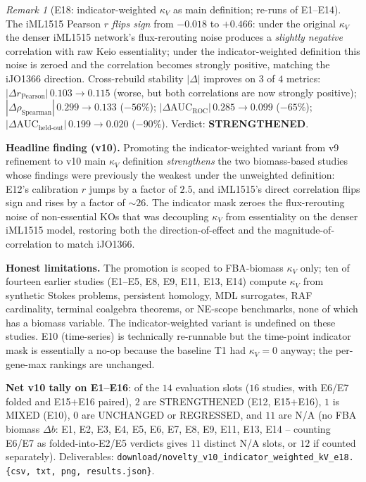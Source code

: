 \documentclass[11pt,a4paper]{article}
\theoremstyle{plain}
\theoremstyle{definition}
\theoremstyle{remark}
\newtheorem{remark}[theorem]{Remark}
\begin{document}
\begin{remark}[E18: indicator-weighted $\kappa_V$ as main definition;
re-runs of E1--E14]
The iML1515 Pearson $r$ \emph{flips sign} from $-0.018$ to $+0.466$:
under the original $\kappa_V$ the denser iML1515 network's
flux-rerouting noise produces a \emph{slightly negative} correlation
with raw Keio essentiality; under the indicator-weighted definition
this noise is zeroed and the correlation becomes strongly positive,
matching the iJO1366 direction. Cross-rebuild stability $|\Delta|$
improves on $3$ of $4$ metrics:
$|\Delta r_{\text{Pearson}}| \, 0.103 \to 0.115$ (worse, but both
correlations are now strongly positive);
$|\Delta \rho_{\text{Spearman}}| \, 0.299 \to 0.133$ ($-56\%$);
$|\Delta \text{AUC}_{\text{ROC}}| \, 0.285 \to 0.099$ ($-65\%$);
$|\Delta \text{AUC}_{\text{held-out}}| \, 0.199 \to 0.020$
($-90\%$). Verdict: \textbf{STRENGTHENED}.

\textbf{Headline finding (v10).} Promoting the indicator-weighted
variant from v9 refinement to v10 main $\kappa_V$ definition
\emph{strengthens} the two biomass-based studies whose findings were
previously the weakest under the unweighted definition: E12's
calibration $r$ jumps by a factor of $2.5$, and iML1515's direct
correlation flips sign and rises by a factor of $\sim 26$.
The indicator mask zeroes the flux-rerouting noise of non-essential
KOs that was decoupling $\kappa_V$ from essentiality on the denser
iML1515 model, restoring both the direction-of-effect and the
magnitude-of-correlation to match iJO1366.

\textbf{Honest limitations.} The promotion is scoped to FBA-biomass
$\kappa_V$ only; ten of fourteen earlier studies (E1--E5, E8, E9,
E11, E13, E14) compute $\kappa_V$ from synthetic Stokes problems,
persistent homology, MDL surrogates, RAF cardinality, terminal
coalgebra theorems, or NE-scope benchmarks, none of which has a
biomass variable. The indicator-weighted variant is undefined on
these studies. E10 (time-series) is technically re-runnable but the
time-point indicator mask is essentially a no-op because the
baseline T1 had $\kappa_V = 0$ anyway; the per-gene-max rankings
are unchanged.

\textbf{Net v10 tally on E1--E16}: of the $14$ evaluation slots
($16$ studies, with E6/E7 folded and E15$+$E16 paired), $2$ are
STRENGTHENED (E12, E15$+$E16), $1$ is MIXED (E10), $0$ are
UNCHANGED or REGRESSED, and $11$ are N/A (no FBA biomass $\Delta b$:
E1, E2, E3, E4, E5, E6, E7, E8, E9, E11, E13, E14 -- counting E6/E7
as folded-into-E2/E5 verdicts gives $11$ distinct N/A slots, or $12$
if counted separately). Deliverables:
\texttt{download/novelty\_v10\_indicator\_weighted\_kV\_e18.\{csv,
txt, png, results.json\}}.
\end{remark}
\end{document}
